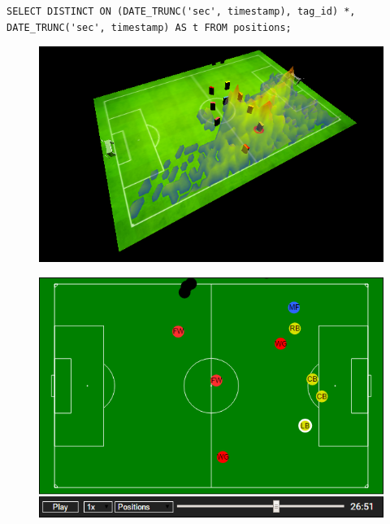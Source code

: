 \documentclass{article}
\begin{document}
\begin{lstlisting}
SELECT DISTINCT ON (DATE_TRUNC('sec', timestamp), tag_id) *, DATE_TRUNC('sec', timestamp) AS t FROM positions;
\end{lstlisting}

\begin{figure}[ht!]
\centering
\begin{minipage}{.5\textwidth}
  \centering
  \includegraphics[width=.9\linewidth]{3dvis.png}
  \label{fig:3dvis}
\end{minipage}%
\begin{minipage}{.5\textwidth}
  \centering
  \includegraphics[width=.9\linewidth]{2dvis.png}
  \label{fig:2dvis}
\end{minipage}
\end{figure}
\end{document}
